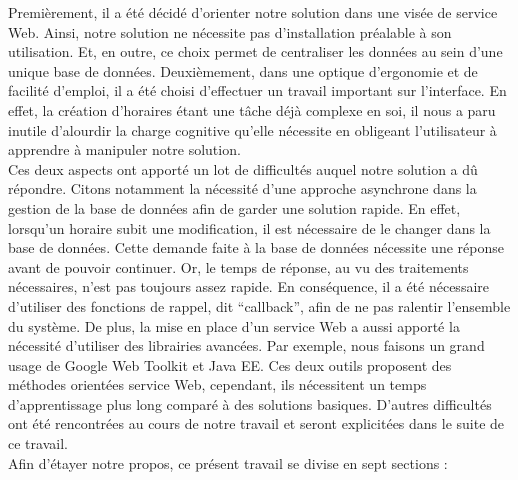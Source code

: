 \newline
\indent
Premièrement, il a été décidé d'orienter notre solution dans une visée de service Web. Ainsi, notre solution ne nécessite pas d'installation préalable à son utilisation. Et, en outre, ce choix permet de centraliser les données au sein d'une unique base de données.
\newline
\indent
Deuxièmement, dans une optique d'ergonomie et de facilité d'emploi, il a été choisi d'effectuer un travail important sur l'interface. En effet, la création d'horaires étant une tâche déjà complexe en soi, il nous a paru inutile d'alourdir la charge cognitive qu'elle nécessite en obligeant l'utilisateur à apprendre à manipuler notre solution.\\
\newline
\indent
Ces deux aspects ont apporté un lot de difficultés auquel notre solution a dû répondre. Citons notamment la nécessité d'une approche asynchrone dans la gestion de la base de données afin de garder une solution rapide. En effet, lorsqu'un horaire subit une modification, il est nécessaire de le changer dans la base de données. Cette demande faite à la base de données nécessite une réponse avant de pouvoir continuer. Or, le temps de réponse, au vu des traitements nécessaires, n'est pas toujours  assez rapide. En conséquence, il a été nécessaire d'utiliser des fonctions de rappel, dit \enquote{callback}, afin de ne pas ralentir l'ensemble du système.
\newline
\indent
De plus, la mise en place d'un service Web a aussi apporté la nécessité d'utiliser des librairies avancées. Par exemple, nous faisons un grand usage de Google Web Toolkit et Java EE. Ces deux outils proposent des méthodes orientées service Web, cependant, ils nécessitent un temps d'apprentissage plus long comparé à des solutions basiques.
\newline
\indent
D'autres difficultés ont été rencontrées au cours de notre travail et seront explicitées dans le suite de ce travail.\\
\newline
\indent
Afin d'étayer notre propos, ce présent travail se divise en sept sections :
